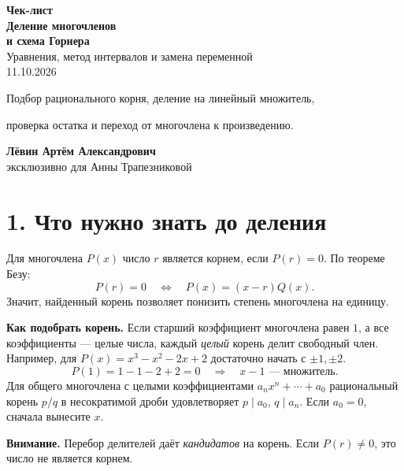 \documentclass[a4paper,12pt]{article}
\newcommand{\lessonsection}[1]{\vspace{0.35em}\section*{\color{darkaccent}#1}\vspace{-0.75em}{\color{accent}\rule{\linewidth}{0.55pt}}\vspace{0.25em}}
\newcommand{\hint}[1]{\par\smallskip\textbf{Внимание.} #1\par}
\begin{document}
\begin{titlepage}
\thispagestyle{empty}
\centering
\vspace*{28mm}
{\Large\color{darkaccent}\textbf{Чек-лист}}\\[10mm]
{\Huge\bfseries Деление многочленов}\\[4mm]
{\LARGE\bfseries и схема Горнера}\\[8mm]
{\large Уравнения, метод интервалов и замена переменной}\\[22mm]
{\large 11.10.2026}\\[27mm]
\begin{minipage}{0.79\textwidth}
\centering\large
Подбор рационального корня, деление на линейный множитель,\par
проверка остатка и переход от многочлена к произведению.
\end{minipage}
\vfill
{\large\textbf{Лёвин Артём Александрович}}\\[3mm]
{\large эксклюзивно для Анны Трапезниковой}
\vspace{16mm}
\end{titlepage}

\lessonsection{1. Что нужно знать до деления}
Для многочлена $P(x)$ число $r$ является корнем, если $P(r)=0$. По теореме Безу:
\[
\boxed{P(r)=0\quad\Longleftrightarrow\quad P(x)=(x-r)Q(x)}.
\]
Значит, найденный корень позволяет понизить степень многочлена на единицу.

\textbf{Как подобрать корень.} Если старший коэффициент многочлена равен $1$, а все коэффициенты --- целые числа, каждый \emph{целый} корень делит свободный член. Например, для $P(x)=x^3-x^2-2x+2$ достаточно начать с $\pm1,\pm2$.
\[
P(1)=1-1-2+2=0 \quad\Longrightarrow\quad x-1\text{ --- множитель.}
\]
Для общего многочлена с целыми коэффициентами $a_nx^n+\cdots+a_0$ рациональный корень $p/q$ в несократимой дроби удовлетворяет $p\mid a_0$, $q\mid a_n$. Если $a_0=0$, сначала вынесите $x$.

\hint{Перебор делителей даёт \emph{кандидатов} на корень. Если $P(r)\ne0$, это число не является корнем.}
\end{document}
